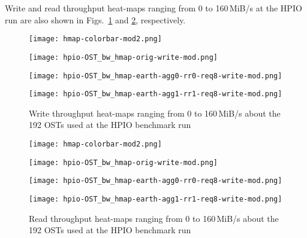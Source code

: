 \documentclass{jhps}
\begin{document}
Write and read throughput heat-maps ranging from 0 to 160\,MiB/s
at the HPIO run are also shown in
Figs.~\ref{fig:HPIO_OST_BW_HMAP_WR} and \ref{fig:HPIO_OST_BW_HMAP_RD}, respectively.
%
\begin{figure}[tb]
\begin{minipage}[t]{0.06\textwidth}
 \texttt{[image: hmap-colorbar-mod2.png]}
\end{minipage}
%
\noindent
\begin{minipage}[t]{0.29\textwidth}
 \centering
 \texttt{[image: hpio-OST\_bw\_hmap-orig-write-mod.png]}
\end{minipage}
%
\noindent
\begin{minipage}[t]{0.29\textwidth}
 \centering
 \texttt{[image: hpio-OST\_bw\_hmap-earth-agg0-rr0-req8-write-mod.png]}
\end{minipage}
%
\noindent
\begin{minipage}[t]{0.31\textwidth}
 \centering
 \texttt{[image: hpio-OST\_bw\_hmap-earth-agg1-rr1-req8-write-mod.png]}
\end{minipage}
%
\caption{Write throughput heat-maps ranging from 0 to 160\,MiB/s about
the 192 OSTs used at the HPIO benchmark run}
\label{fig:HPIO_OST_BW_HMAP_WR}
\end{figure}
%
\begin{figure}[tb]
\begin{minipage}[t]{0.06\textwidth}
 \texttt{[image: hmap-colorbar-mod2.png]}
\end{minipage}
%
\noindent
\begin{minipage}[t]{0.29\textwidth}
 \centering
 \texttt{[image: hpio-OST\_bw\_hmap-orig-write-mod.png]}
\end{minipage}
%
\noindent
\begin{minipage}[t]{0.29\textwidth}
 \centering
 \texttt{[image: hpio-OST\_bw\_hmap-earth-agg0-rr0-req8-write-mod.png]}
\end{minipage}
%
\noindent
\begin{minipage}[t]{0.31\textwidth}
 \centering
 \texttt{[image: hpio-OST\_bw\_hmap-earth-agg1-rr1-req8-write-mod.png]}
\end{minipage}
%
\caption{Read throughput heat-maps ranging from 0 to 160\,MiB/s about
the 192 OSTs used at the HPIO benchmark run}
\label{fig:HPIO_OST_BW_HMAP_RD}
\end{figure}
\end{document}
